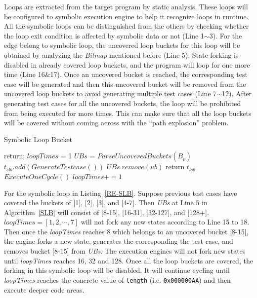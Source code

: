 Loops are extracted from the target program by static analysis. These loops will be configured to symbolic execution engine to help it recognize loops in runtime. All the symbolic loops can be distinguished from the others by checking whether the loop exit condition is affected by symbolic data or not (Line 1$\sim$3). For the edge belong to symbolic loop, the uncovered loop buckets for this loop will be obtained by analyzing the \textit{Bitmap} mentioned before (Line 5). 
State forking is disabled in already covered loop buckets, and the program will loop for one more time (Line 16\&17). Once an uncovered bucket is reached, the corresponding test case will be generated and then this uncovered bucket will be removed from the uncovered loop buckets to avoid generating multiple test cases (Line 7$\sim$12). After generating test cases for all the uncovered buckets, the loop will be prohibited from being executed for more times. This can make sure that all the loop buckets will be covered without coming across with the ``path explosion'' problem.

\begin{algorithm}
  \caption{Symbolic Loop Bucket}
  \label{SLB}
  {
    return;
  }
  $loopTimes$ = 1\;
  $UBs$ = $ParseUncoveredBuckets(B_p)$\;
  {
    {
      {
        $t_{slb}.add(GenerateTestcase())$\;
        $UBs$.$remove(ub)$\;
      }
    }
    {
      return $t_{lsb}$\;
    }{
      $ExecuteOneCycle()$\;
      $loopTimes += 1$\;
    }
  }
\end{algorithm}  

For the symbolic loop in Listing~\ref{RE-SLB}. Suppose previous test cases have covered the buckets of [1], [2], [3], and [4-7]. Then \textit{UBs} at Line 5 in Algorithm~\ref{SLB} will consist of [8-15], [16-31], [32-127], and [128+]. $\textit{loopTimes}=[1, 2, \cdots, 7]$ will not fork any new states according to Line 15 to 18. Then once the \textit{loopTimes} reaches 8 which belongs to an uncovered bucket [8-15], the engine forks a new state,  generates the corresponding the test case, and removes bucket [8-15] from \textit{UBs}. The execution engines will not fork new states until \textit{loopTimes} reaches 16, 32 and 128. Once all the loop buckets are covered, the forking in this symbolic loop will be disabled. It will continue cycling until \textit{loopTimes} reaches the concrete value of \texttt{length} (i.e. \texttt{0x000000AA}) and then execute deeper code areas.